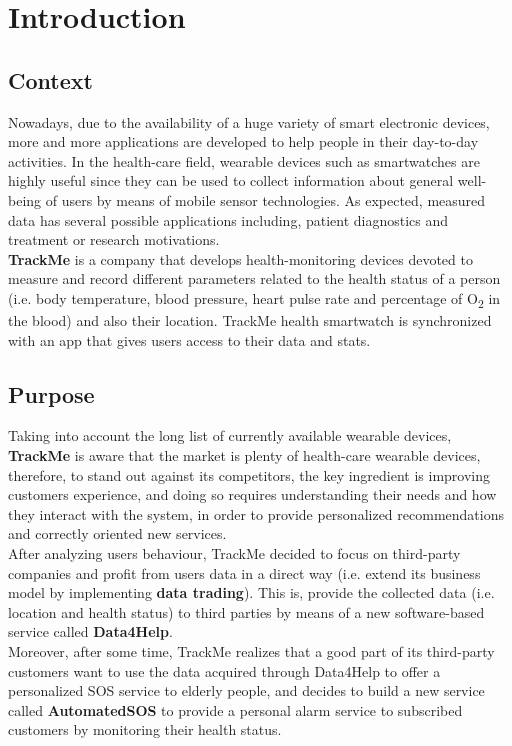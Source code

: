 \documentclass[a4paper, hidelinks, 12pt]{report}
\begin{document}
	\chapter{Introduction}
	\section{Context}
	Nowadays, due to the availability of a huge variety of smart electronic devices, more and more applications are developed to help people in their day-to-day activities. In the health-care field, wearable devices such as smartwatches are highly useful since they can be used to collect information about general well-being of users by means of mobile sensor technologies. As expected, measured data has several possible applications including, patient diagnostics and treatment or research motivations. \\
	
	\textbf{TrackMe} is a company that develops health-monitoring devices devoted to measure and record different parameters related to the health status of a person (i.e. body temperature, blood pressure, heart pulse rate and percentage of O\textsubscript{2} in the blood) and also their location. TrackMe health smartwatch is synchronized with an app that gives users access to their data and stats.
	
	\section{Purpose}
	Taking into account the long list of currently available wearable devices, \textbf{TrackMe}  is aware that the market is plenty of health-care wearable devices, therefore, to stand out against its competitors, the key ingredient is improving customers experience, and doing so requires understanding their needs and how they interact with the system, in order to provide personalized recommendations and correctly oriented new services. \\
	
	After analyzing users behaviour, TrackMe decided to focus on third-party companies and profit from users data in a direct way (i.e. extend its business model by implementing \textbf{data trading}). This is, provide the collected data (i.e. location and health status) to third parties by means of a new software-based service called \textbf{Data4Help}. \\
	
	Moreover, after some time, TrackMe realizes that a good part of its third-party customers want to use the data acquired through Data4Help to offer a personalized SOS service to elderly people, and decides to build a new service called \textbf{AutomatedSOS} to provide a personal alarm service to subscribed customers by monitoring their health status. \\
	
\end{document}
